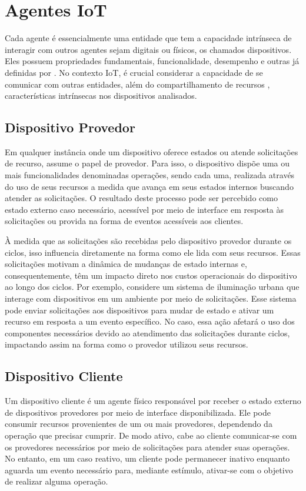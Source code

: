 \section{Agentes \acs{IoT}}
Cada agente é essencialmente uma entidade que tem a capacidade intrínseca de interagir com outros agentes sejam digitais ou físicos, os chamados dispositivos. Eles possuem propriedades fundamentais, funcionalidade, desempenho e outras já definidas por . No contexto \acs{IoT}, é crucial considerar a capacidade de se comunicar com outras entidades, além do compartilhamento de recursos \cite{asghari_internet_2019}, características intrínsecas nos dispositivos analisados.


\subsection{Dispositivo Provedor}

Em qualquer instância onde um dispositivo oferece estados ou atende solicitações de recurso, assume o papel de provedor. Para isso, o dispositivo dispõe uma ou mais funcionalidades denominadas operações, sendo cada uma, realizada através do uso de seus recursos a medida que avança em seus estados internos buscando atender as solicitações. O resultado deste processo pode ser percebido como estado externo caso necessário, acessível por meio de interface em resposta às solicitações ou provida na forma de eventos acessíveis aos clientes. 


À medida que as solicitações são recebidas pelo dispositivo provedor durante os ciclos, isso influencia diretamente na forma como ele lida com seus recursos. Essas solicitações motivam a dinâmica de mudanças de estado internas e, consequentemente, têm um impacto direto nos custos operacionais do dispositivo ao longo dos ciclos. Por exemplo, considere um sistema de iluminação urbana que interage com dispositivos em um ambiente por meio de solicitações. Esse sistema pode enviar solicitações aos dispositivos para mudar de estado e ativar um recurso em resposta a um evento específico. No caso, essa ação afetará o uso dos componentes necessários devido ao atendimento das solicitações durante ciclos, impactando assim na forma como o provedor utilizou seus recursos.


\subsection{Dispositivo Cliente}
Um dispositivo cliente é um agente físico responsável por receber o estado externo de dispositivos provedores por meio de interface disponibilizada. Ele pode consumir recursos provenientes de um ou mais provedores, dependendo da operação que precisar cumprir. De modo ativo, cabe ao cliente comunicar-se com os provedores necessários por meio de solicitações para atender suas operações. No entanto, em um caso reativo, um cliente pode permanecer inativo enquanto aguarda um evento necessário para, mediante estímulo, ativar-se com o objetivo de realizar alguma operação.


